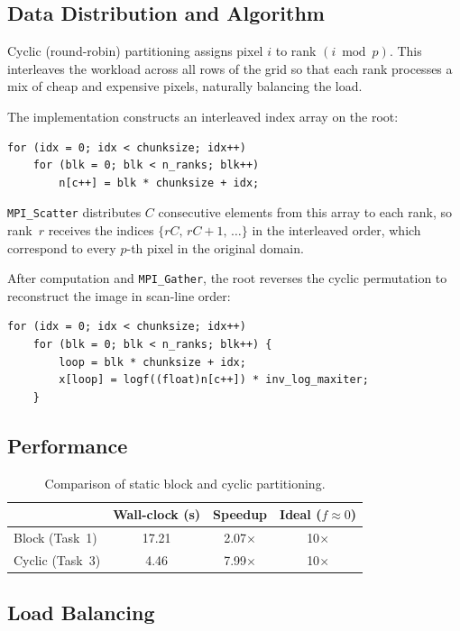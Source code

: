 \documentclass[11pt,a4paper]{article}
\begin{document}
\subsection{Data Distribution and Algorithm}

Cyclic (round-robin) partitioning assigns pixel $i$ to rank $(i \bmod p)$.
This interleaves the workload across all rows of the grid so that each rank
processes a mix of cheap and expensive pixels, naturally balancing the load.

The implementation constructs an interleaved index array on the root:
\begin{lstlisting}
for (idx = 0; idx < chunksize; idx++)
    for (blk = 0; blk < n_ranks; blk++)
        n[c++] = blk * chunksize + idx;
\end{lstlisting}
\texttt{MPI\_Scatter} distributes $C$ consecutive elements from this array
to each rank, so rank~$r$ receives the indices
$\{r C,\, r C{+}1,\, \ldots\}$ in the interleaved order, which correspond
to every $p$-th pixel in the original domain.

After computation and \texttt{MPI\_Gather}, the root reverses the cyclic
permutation to reconstruct the image in scan-line order:
\begin{lstlisting}
for (idx = 0; idx < chunksize; idx++)
    for (blk = 0; blk < n_ranks; blk++) {
        loop = blk * chunksize + idx;
        x[loop] = logf((float)n[c++]) * inv_log_maxiter;
    }
\end{lstlisting}

\subsection{Performance}

\begin{table}[h]\centering
\begin{tabular}{@{}lccc@{}}
\toprule
 & Wall-clock (s) & Speedup & Ideal ($f{\approx}0$) \\
\midrule
Block  (Task~1) & 17.21 & 2.07$\times$ & 10$\times$ \\
Cyclic (Task~3) &  4.46 & 7.99$\times$ & 10$\times$ \\
\bottomrule
\end{tabular}
\caption{Comparison of static block and cyclic partitioning.}
\label{tab:task3}
\end{table}

\subsection{Load Balancing}
\end{document}
